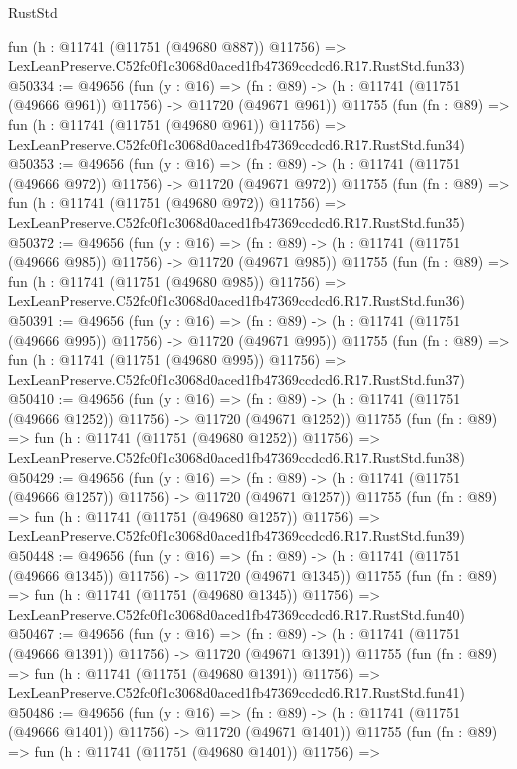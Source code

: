 \begin{lexlean}{RustStd}
\begin{coremodule}
    fun (h : @11741 (@11751 (@49680 @887)) @11756) =>
    LexLeanPreserve.C52fc0f1c3068d0aced1fb47369ccdcd6.R17.RustStd.fun33)
@50334 := @49656
    (fun (y : @16) =>
    (fn : @89) -> (h : @11741 (@11751 (@49666 @961)) @11756) -> @11720 (@49671 @961))
    @11755
    (fun (fn : @89) =>
    fun (h : @11741 (@11751 (@49680 @961)) @11756) =>
    LexLeanPreserve.C52fc0f1c3068d0aced1fb47369ccdcd6.R17.RustStd.fun34)
@50353 := @49656
    (fun (y : @16) =>
    (fn : @89) -> (h : @11741 (@11751 (@49666 @972)) @11756) -> @11720 (@49671 @972))
    @11755
    (fun (fn : @89) =>
    fun (h : @11741 (@11751 (@49680 @972)) @11756) =>
    LexLeanPreserve.C52fc0f1c3068d0aced1fb47369ccdcd6.R17.RustStd.fun35)
@50372 := @49656
    (fun (y : @16) =>
    (fn : @89) -> (h : @11741 (@11751 (@49666 @985)) @11756) -> @11720 (@49671 @985))
    @11755
    (fun (fn : @89) =>
    fun (h : @11741 (@11751 (@49680 @985)) @11756) =>
    LexLeanPreserve.C52fc0f1c3068d0aced1fb47369ccdcd6.R17.RustStd.fun36)
@50391 := @49656
    (fun (y : @16) =>
    (fn : @89) -> (h : @11741 (@11751 (@49666 @995)) @11756) -> @11720 (@49671 @995))
    @11755
    (fun (fn : @89) =>
    fun (h : @11741 (@11751 (@49680 @995)) @11756) =>
    LexLeanPreserve.C52fc0f1c3068d0aced1fb47369ccdcd6.R17.RustStd.fun37)
@50410 := @49656
    (fun (y : @16) =>
    (fn : @89) -> (h : @11741 (@11751 (@49666 @1252)) @11756) -> @11720 (@49671 @1252))
    @11755
    (fun (fn : @89) =>
    fun (h : @11741 (@11751 (@49680 @1252)) @11756) =>
    LexLeanPreserve.C52fc0f1c3068d0aced1fb47369ccdcd6.R17.RustStd.fun38)
@50429 := @49656
    (fun (y : @16) =>
    (fn : @89) -> (h : @11741 (@11751 (@49666 @1257)) @11756) -> @11720 (@49671 @1257))
    @11755
    (fun (fn : @89) =>
    fun (h : @11741 (@11751 (@49680 @1257)) @11756) =>
    LexLeanPreserve.C52fc0f1c3068d0aced1fb47369ccdcd6.R17.RustStd.fun39)
@50448 := @49656
    (fun (y : @16) =>
    (fn : @89) -> (h : @11741 (@11751 (@49666 @1345)) @11756) -> @11720 (@49671 @1345))
    @11755
    (fun (fn : @89) =>
    fun (h : @11741 (@11751 (@49680 @1345)) @11756) =>
    LexLeanPreserve.C52fc0f1c3068d0aced1fb47369ccdcd6.R17.RustStd.fun40)
@50467 := @49656
    (fun (y : @16) =>
    (fn : @89) -> (h : @11741 (@11751 (@49666 @1391)) @11756) -> @11720 (@49671 @1391))
    @11755
    (fun (fn : @89) =>
    fun (h : @11741 (@11751 (@49680 @1391)) @11756) =>
    LexLeanPreserve.C52fc0f1c3068d0aced1fb47369ccdcd6.R17.RustStd.fun41)
@50486 := @49656
    (fun (y : @16) =>
    (fn : @89) -> (h : @11741 (@11751 (@49666 @1401)) @11756) -> @11720 (@49671 @1401))
    @11755
    (fun (fn : @89) =>
    fun (h : @11741 (@11751 (@49680 @1401)) @11756) =>

\end{coremodule}
\end{lexlean}
